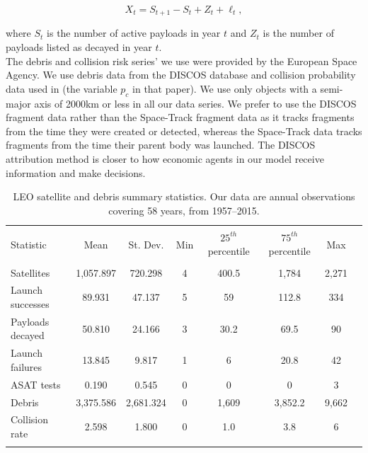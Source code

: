 \documentclass[12pt]{article}
\begin{document}
\begin{equation}
\label{launchRateAccounting}
X_t = S_{t+1} - S_t + Z_t + \ell_t,
\end{equation}

where $S_t$ is the number of active payloads in year $t$ and $Z_t$ is the number of payloads listed as decayed in year $t$. \\

The debris and collision risk series' we use were provided by the European Space Agency. We use debris data from the DISCOS database \citep{FRAGdata} and collision probability data used in \citep{ECOBdata} (the variable $p_c$ in that paper). We use only objects with a semi-major axis of 2000km or less in all our data series. We prefer to use the DISCOS fragment data rather than the Space-Track fragment data as it tracks fragments from the time they were created or detected, whereas the Space-Track data tracks fragments from the time their parent body was launched. The DISCOS attribution method is closer to how economic agents in our model receive information and make decisions. %

\begin{table}[!htbp] \centering 
	\caption[LEO satellite and debris summary statistics]{LEO satellite and debris summary statistics. Our data are annual observations covering 58 years, from 1957--2015.} 
	\label{physstock_sumstat} 
	\hspace*{-1cm}
	\begin{tabular}{@{\extracolsep{5pt}}lccccccc} 
		\\[-1.8ex]\hline 
		\hline \\[-1.8ex] 
		Statistic & \multicolumn{1}{c}{Mean} & \multicolumn{1}{c}{St. Dev.} & \multicolumn{1}{c}{Min} & \multicolumn{1}{c}{$25^{th}$ percentile} & \multicolumn{1}{c}{$75^{th}$ percentile} & \multicolumn{1}{c}{Max} \\ 
		\hline \\[-1.8ex] 
		Satellites & 1,057.897 & 720.298 & 4 & 400.5 & 1,784 & 2,271 \\ 
		Launch successes & 89.931 & 47.137 & 5 & 59 & 112.8 & 334 \\ 
		Payloads decayed & 50.810 & 24.166 & 3 & 30.2 & 69.5 & 90 \\ 
		Launch failures & 13.845 & 9.817 & 1 & 6 & 20.8 & 42 \\ 
		ASAT tests & 0.190 & 0.545 & 0 & 0 & 0 & 3 \\ 
		Debris & 3,375.586 & 2,681.324 & 0 & 1,609 & 3,852.2 & 9,662 \\ 
		Collision rate & 2.598 & 1.800 & 0 & 1.0 & 3.8 & 6 \\ 
		\hline \\[-1.8ex] 
	\end{tabular} 
\end{table} 
\end{document}
